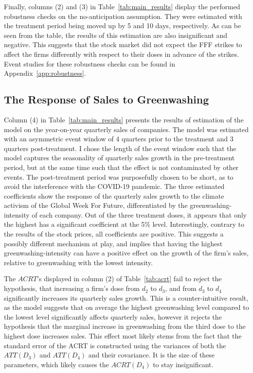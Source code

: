 \documentclass[12pt]{article}
\begin{document}
Finally, columns (2) and (3) in Table~\ref{tab:main_results} display the performed robustness checks on the no-anticipation assumption. They were estimated with the treatment period being moved up by 5 and 10 days, respectively. As can be seen from the table, the results of this estimation are also insignificant and negative. This suggests that the stock market did not expect the FFF strikes to affect the firms differently with respect to their doses in advance of the strikes. Event studies for these robustness checks can be found in Appendix~\ref{app:robustness}.





\subsection{The Response of Sales to Greenwashing}

Column (4) in Table~\ref{tab:main_results} presents the results of estimation of the model on the year-on-year quarterly sales of companies. The model was estimated with an asymmetric event window of 4 quarters prior to the treatment and 3 quarters post-treatment. I chose the length of the event window such that the model captures the seasonality of quarterly sales growth in the pre-treatment period, but at the same time such that the effect is not contaminated by other events. The post-treatment period was purposefully chosen to be short, as to avoid the interference with the COVID-19 pandemic. The three estimated coefficients show the response of the quarterly sales growth to the climate activism of the Global Week For Future, differentiated by the greenwashing-intensity of each company. Out of the three treatment doses, it appears that only the highest has a significant coefficient at the 5\% level. Interestingly, contrary to the results of the stock prices, all coefficients are positive. This suggests a possibly different mechanism at play, and implies that having the highest greenwashing-intensity can have a positive effect on the growth of the firm's sales, relative to greenwashing with the lowest intensity.

The $ACRT$'s displayed in column (2) of Table~\ref{tab:acrt} fail to reject the hypothesis, that increasing a firm's dose from $d_2$ to $d_3$, and from $d_3$ to $d_4$ significantly increases its quarterly sales growth. This is a counter-intuitive result, as the model suggests that on average the highest greenwashing level compared to the lowest level significantly affects quarterly sales, however it rejects the hypothesis that the marginal increase in greenwashing from the third dose to the highest dose increases sales. This effect most likely stems from the fact that the standard error of the ACRT is constructed using the variances of both the $ATT(D_3)$ and $ATT(D_4)$ and their covariance. It is the size of these parameters, which likely causes the $ACRT(D_4)$ to stay insignificant.
\end{document}
